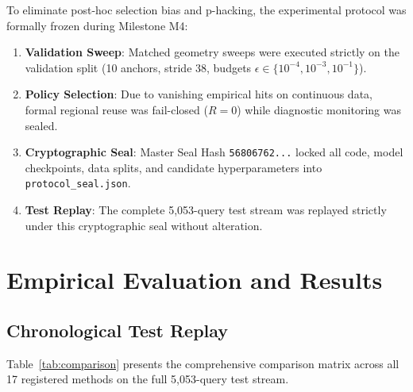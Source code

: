 \documentclass[10pt,twocolumn]{article}
\begin{document}
To eliminate post-hoc selection bias and p-hacking, the experimental protocol was formally frozen during Milestone M4:
\begin{enumerate}
    \item \textbf{Validation Sweep}: Matched geometry sweeps were executed strictly on the validation split (10 anchors, stride 38, budgets $\epsilon \in \{10^{-4}, 10^{-3}, 10^{-1}\}$).
    \item \textbf{Policy Selection}: Due to vanishing empirical hits on continuous data, formal regional reuse was fail-closed ($R = 0$) while diagnostic monitoring was sealed.
    \item \textbf{Cryptographic Seal}: Master Seal Hash \texttt{56806762...} locked all code, model checkpoints, data splits, and candidate hyperparameters into \texttt{protocol\_seal.json}.
    \item \textbf{Test Replay}: The complete 5,053-query test stream was replayed strictly under this cryptographic seal without alteration.
\end{enumerate}

\section{Empirical Evaluation and Results}

\subsection{Chronological Test Replay}
Table~\ref{tab:comparison} presents the comprehensive comparison matrix across all 17 registered methods on the full 5,053-query test stream.
\end{document}
